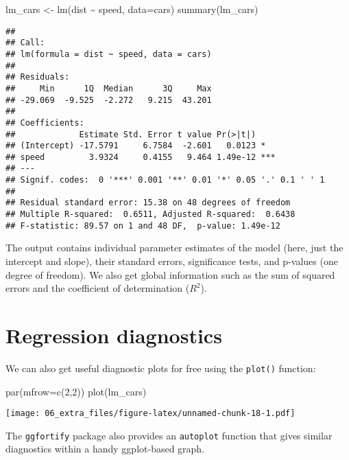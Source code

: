 \documentclass[
]{book}
\newenvironment{Shaded}{\begin{snugshade}}{\end{snugshade}}
\newcommand{\AttributeTok}[1]{\textcolor[rgb]{0.77,0.63,0.00}{#1}}
\newcommand{\DecValTok}[1]{\textcolor[rgb]{0.00,0.00,0.81}{#1}}
\newcommand{\FunctionTok}[1]{\textcolor[rgb]{0.00,0.00,0.00}{#1}}
\newcommand{\NormalTok}[1]{#1}
\newcommand{\OtherTok}[1]{\textcolor[rgb]{0.56,0.35,0.01}{#1}}
\newcommand{\SpecialCharTok}[1]{\textcolor[rgb]{0.00,0.00,0.00}{#1}}
\begin{document}
\begin{Shaded}
\begin{Highlighting}[]
\NormalTok{lm\_cars }\OtherTok{\textless{}{-}} \FunctionTok{lm}\NormalTok{(dist }\SpecialCharTok{\textasciitilde{}}\NormalTok{ speed, }\AttributeTok{data=}\NormalTok{cars)}
\FunctionTok{summary}\NormalTok{(lm\_cars)}
\end{Highlighting}
\end{Shaded}

\begin{verbatim}
## 
## Call:
## lm(formula = dist ~ speed, data = cars)
## 
## Residuals:
##     Min      1Q  Median      3Q     Max 
## -29.069  -9.525  -2.272   9.215  43.201 
## 
## Coefficients:
##             Estimate Std. Error t value Pr(>|t|)    
## (Intercept) -17.5791     6.7584  -2.601   0.0123 *  
## speed         3.9324     0.4155   9.464 1.49e-12 ***
## ---
## Signif. codes:  0 '***' 0.001 '**' 0.01 '*' 0.05 '.' 0.1 ' ' 1
## 
## Residual standard error: 15.38 on 48 degrees of freedom
## Multiple R-squared:  0.6511, Adjusted R-squared:  0.6438 
## F-statistic: 89.57 on 1 and 48 DF,  p-value: 1.49e-12
\end{verbatim}

The output contains individual parameter estimates of the model (here, just the intercept and slope), their standard errors, significance tests, and p-values (one degree of freedom). We also get global information such as the sum of squared errors and the coefficient of determination (\(R^2\)).

\hypertarget{regression-diagnostics}{%
\section{Regression diagnostics}\label{regression-diagnostics}}

We can also get useful diagnostic plots for free using the \texttt{plot()} function:

\begin{Shaded}
\begin{Highlighting}[]
\FunctionTok{par}\NormalTok{(}\AttributeTok{mfrow=}\FunctionTok{c}\NormalTok{(}\DecValTok{2}\NormalTok{,}\DecValTok{2}\NormalTok{))}
\FunctionTok{plot}\NormalTok{(lm\_cars)}
\end{Highlighting}
\end{Shaded}

\texttt{[image: 06\_extra\_files/figure-latex/unnamed-chunk-18-1.pdf]}

The \texttt{ggfortify} package also provides an \texttt{autoplot} function that gives similar diagnostics within a handy ggplot-based graph.
\end{document}
